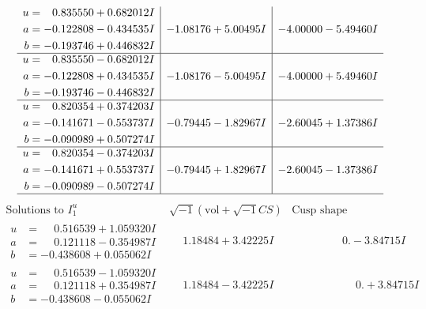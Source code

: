\documentclass[1p]{elsarticle_modified}
\theoremstyle{definition}
\newcommand{\I}{\sqrt{-1}}
\begin{document}
$$\begin{array}{c|c|c}
\begin{aligned}
u &= \phantom{-}0.835550 + 0.682012 I \\
a &= -0.122808 - 0.434535 I \\
b &= -0.193746 + 0.446832 I\end{aligned}
 & -1.08176 + 5.00495 I & -4.00000 - 5.49460 I \\ \hline\begin{aligned}
u &= \phantom{-}0.835550 - 0.682012 I \\
a &= -0.122808 + 0.434535 I \\
b &= -0.193746 - 0.446832 I\end{aligned}
 & -1.08176 - 5.00495 I & -4.00000 + 5.49460 I \\ \hline\begin{aligned}
u &= \phantom{-}0.820354 + 0.374203 I \\
a &= -0.141671 - 0.553737 I \\
b &= -0.090989 + 0.507274 I\end{aligned}
 & -0.79445 - 1.82967 I & -2.60045 + 1.37386 I \\ \hline\begin{aligned}
u &= \phantom{-}0.820354 - 0.374203 I \\
a &= -0.141671 + 0.553737 I \\
b &= -0.090989 - 0.507274 I\end{aligned}
 & -0.79445 + 1.82967 I & -2.60045 - 1.37386 I\\
 \hline 
 \end{array}$$\newpage$$\begin{array}{c|c|c}  
\text{Solutions to }I^u_{1}& \I (\text{vol} + \sqrt{-1}CS) & \text{Cusp shape}\\
 \hline 
\begin{aligned}
u &= \phantom{-}0.516539 + 1.059320 I \\
a &= \phantom{-}0.121118 - 0.354987 I \\
b &= -0.438608 + 0.055062 I\end{aligned}
 & \phantom{-}1.18484 + 3.42225 I & \phantom{-0.000000 } 0. - 3.84715 I \\ \hline\begin{aligned}
u &= \phantom{-}0.516539 - 1.059320 I \\
a &= \phantom{-}0.121118 + 0.354987 I \\
b &= -0.438608 - 0.055062 I\end{aligned}
 & \phantom{-}1.18484 - 3.42225 I & \phantom{-0.000000 -}0. + 3.84715 I \\ \hline\begin{aligned}

\end{aligned}
\end{array}$$
\end{document}
